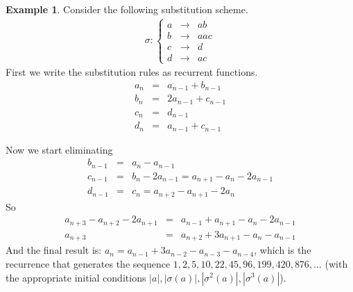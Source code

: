 \documentclass{article}
\theoremstyle{definition}
\newtheorem{example}[theorem]{Example}
\begin{document}
\begin{example}
Consider the following substitution scheme.
\begin{eqnarray*}
\sigma: \left\{ \begin{array}{lll}
a &\rightarrow& ab\\
b &\rightarrow& aac\\
c &\rightarrow& d\\
d &\rightarrow& ac
\end{array} \right.
\end{eqnarray*}
First we write the substitution rules as recurrent functions.
\begin{eqnarray*}
a_n &=& a_{n - 1} + b_{n - 1}\\
b_n &=& 2a_{n - 1} + c_{n - 1}\\
c_n &=& d_{n - 1}\\
d_n &=& a_{n - 1} + c_{n - 1}
\end{eqnarray*}

Now we start eliminating 
\begin{eqnarray*}
b_{n - 1} &=& a_n - a_{n - 1}\\
c_{n - 1} &=& b_n - 2a_{n - 1} = a_{n + 1} - a_n - 2a_{n - 1}\\
d_{n - 1} &=& c_n = a_{n + 2} - a_{n + 1} - 2a_n
\end{eqnarray*}
So
\begin{eqnarray*}
a_{n + 3} - a_{n + 2} - 2a_{n + 1} &=& 
  a_{n - 1} + a_{n + 1} - a_n - 2a_{n - 1}\\
a_{n + 3} &=& a_{n + 2} + 3a_{n + 1} - a_n - a_{n - 1}
\end{eqnarray*}
And the final result is:
$a_n = a_{n - 1} + 3a_{n - 2} - a_{n - 3} - a_{n - 4}$, which is the recurrence
that generates the sequence $1, 2, 5, 10, 22, 45, 96, 199, 420, 876, \ldots$
(with the appropriate initial conditions
$|a|, |\sigma(a)|, |\sigma^2(a)|, |\sigma^3(a)|$).
\end{example}
\end{document}
